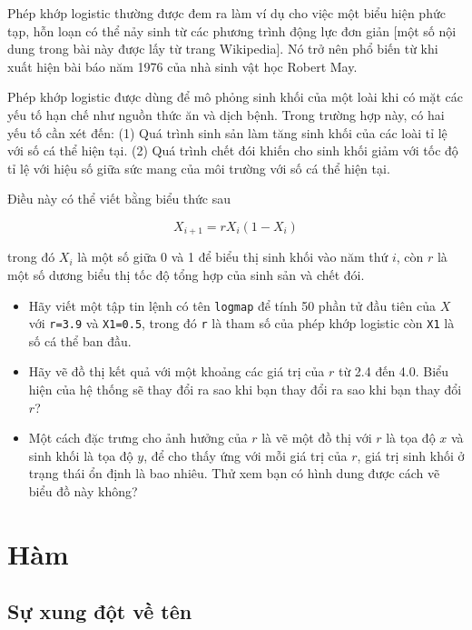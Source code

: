 \documentclass[12pt]{book}
\begin{document}
\begin{ex}

Phép khớp logistic thường được đem ra làm ví dụ cho việc một biểu hiện
phức tạp, hỗn loạn có thể nảy sinh từ các phương trình động lực đơn giản
[một số nội dung trong bài này được lấy từ trang Wikipedia]. Nó 
trở nên phổ biến từ khi xuất hiện bài báo năm 1976 của nhà sinh vật học
Robert May.

Phép khớp logistic được dùng để mô phỏng sinh khối của một loài khi
có mặt các yếu tố hạn chế như nguồn thức ăn và dịch bệnh. Trong 
trường hợp này, có hai yếu tố cần xét đến:
(1) Quá trình sinh sản làm tăng sinh khối của các loài tỉ lệ với
số cá thể hiện tại.
(2) Quá trình chết đói khiến cho sinh khối giảm với tốc độ tỉ lệ
với hiệu số giữa sức mang của môi trường với số cá thể hiện tại.

Điều này có thể viết bằng biểu thức sau

\[ X_{i+1} = r X_i (1-X_i) \]

trong đó $X_i$ là một số giữa 0 và 1 để biểu thị sinh khối vào năm
thứ $i$, còn $r$ là một số dương biểu thị tốc độ tổng hợp của sinh sản
và chết đói.

\begin{itemize}

\item Hãy viết một tập tin lệnh có tên {\tt logmap} để tính 50
phần tử đầu tiên của $X$ với {\tt r=3.9} và {\tt X1=0.5}, trong đó
{\tt r} là tham số của phép khớp logistic còn {\tt X1} là số cá
thể ban đầu.

\item Hãy vẽ đồ thị kết quả với một khoảng các giá trị của $r$ từ 
2.4 đến 4.0. Biểu hiện của hệ thống sẽ thay đổi ra sao khi bạn
thay đổi ra sao khi bạn thay đổi $r$?

\item Một cách đặc trưng cho ảnh hưởng của $r$ là vẽ một đồ thị với
$r$ là tọa độ $x$ và sinh khối là tọa độ $y$, để cho thấy ứng với
mỗi giá trị của $r$, giá trị sinh khối ở trạng thái ổn định là bao
nhiêu. Thử xem bạn có hình dung được cách vẽ biểu đồ này không?

\end{itemize}

\end{ex}


\chapter{Hàm}

\section{Sự xung đột về tên}
\end{document}
